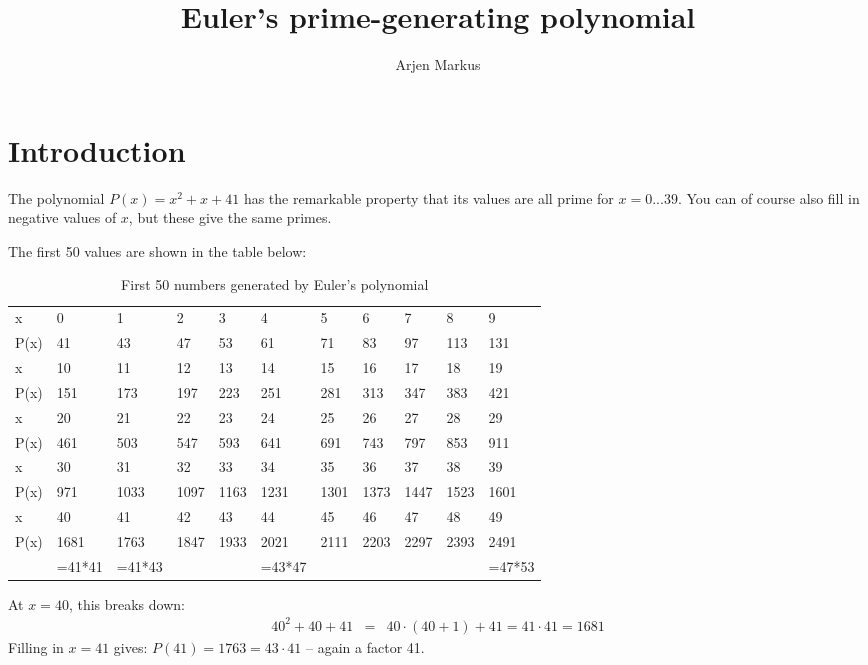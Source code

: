 \documentclass[onecolumn]{article}
\begin{document}
\title{Euler's prime-generating polynomial}

\author{Arjen Markus}

\maketitle

\section*{Introduction}
The polynomial $P(x) = x^2 + x + 41$ has the remarkable property that its values are all prime for
$x = 0 ... 39$. You can of course also fill in negative values of $x$, but these give the same
primes.

The first 50 values are shown in the table below:
\begin{table}[h!]
\caption{First 50 numbers generated by Euler's polynomial}
\label{firstnumbers}
\begin{tabular}{l|llllllllll}
\hline
x    &    0  &    1 &    2 &    3 &    4 &    5 &    6 &    7 &    8 &    9  \\
P(x) &   41  &   43 &   47 &   53 &   61 &   71 &   83 &   97 &  113 &  131  \\
\hline
x    &   10  &   11 &   12 &   13 &   14 &   15 &   16 &   17 &   18 &   19  \\
P(x) &  151  &  173 &  197 &  223 &  251 &  281 &  313 &  347 &  383 &  421  \\
\hline
x    &   20  &   21 &   22 &   23 &   24 &   25 &   26 &   27 &   28 &   29  \\
P(x) &  461  &  503 &  547 &  593 &  641 &  691 &  743 &  797 &  853 &  911  \\
\hline
x    &   30  &   31 &   32 &   33 &   34 &   35 &   36 &   37 &   38 &   39  \\
P(x) &  971  & 1033 & 1097 & 1163 & 1231 & 1301 & 1373 & 1447 & 1523 & 1601  \\
\hline
x    &   40  &   41 &   42 &   43 &   44 &   45 &   46 &   47 &   48 &   49  \\
P(x) & 1681  & 1763 & 1847 & 1933 & 2021 & 2111 & 2203 & 2297 & 2393 & 2491  \\
     &=41*41 &=41*43&      &      &=43*47&      &      &      &      &=47*53 \\
\hline
\end{tabular}
\end{table}

At $x = 40$, this breaks down:
\begin{eqnarray}
   40^2 + 40 + 41 &=& 40 \cdot (40 + 1) + 41 = 41 \cdot 41 = 1681
\end{eqnarray}
Filling in $x = 41$ gives: $P(41) = 1763 = 43 \cdot 41$ -- again a factor 41.
\end{document}
